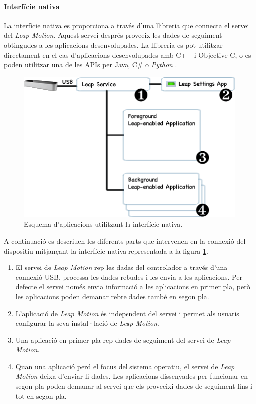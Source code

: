 \documentclass[12pt,a4paper,catalan]{article}
\begin{document}
	\paragraph{Interfície nativa}
	La interfície nativa es proporciona a través d'una llibreria que connecta el servei del \textit{Leap Motion}. Aquest servei després proveeix les dades de seguiment obtingudes a les aplicacions desenvolupades. La llibreria es pot utilitzar directament en el cas d'aplicacions desenvolupades amb C++ i Objective C, o es poden utilitzar una de les APIs per Java, C\# o \textit{Python} \cite{leapsdkdocs}.
	\begin{figure}[H]
		\includegraphics[width=\textwidth,keepaspectratio]{native-interface.png}
		\centering
		\caption{Esquema d'aplicacions utilitzant la interfície nativa.}
		\label{fig:native-interface}
	\end{figure}
	A continuació es descriuen les diferents parts que intervenen en la connexió del dispositiu mitjançant la interfície nativa representada a la figura \ref{fig:native-interface}.
	\begin{enumerate}
		\item El servei de \textit{Leap Motion} rep les dades del controlador a través d'una connexió USB, processa les dades rebudes i les envia a les aplicacions. Per defecte el servei només envia informació a les aplicacions en primer pla, però les aplicacions poden demanar rebre dades també en segon pla.
		\item L'aplicació de \textit{Leap Motion} és independent del servei i permet als usuaris configurar la seva instal·lació de \textit{Leap Motion}.
		\item Una aplicació en primer pla rep dades de seguiment del servei de \textit{Leap Motion}.
		\item Quan una aplicació perd el focus del sistema operatiu, el servei de \textit{Leap Motion} deixa d'enviar-li dades. Les aplicacions dissenyades per funcionar en segon pla poden demanar al servei que els proveeixi dades de seguiment fins i tot en segon pla.
	\end{enumerate}
	
\end{document}
